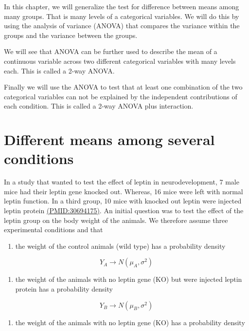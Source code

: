 \documentclass[
]{book}
\providecommand{\tightlist}{%
  \setlength{\itemsep}{0pt}\setlength{\parskip}{0pt}}
\begin{document}
In this chapter, we will generalize the test for difference between means among many groups. That is many levels of a categorical variables. We will do this by using the analysis of variance (ANOVA) that compares the variance within the groups and the variance between the groups.

We will see that ANOVA can be further used to describe the mean of a continuous variable across two different categorical variables with many levels each. This is called a 2-way ANOVA.

Finally we will use the ANOVA to test that at least one combination of the two categorical variables can not be explained by the independent contributions of each condition. This is called a 2-way ANOVA plus interaction.

\hypertarget{different-means-among-several-conditions}{%
\section{Different means among several conditions}\label{different-means-among-several-conditions}}

In a study that wanted to test the effect of leptin in neurodevelopment, 7 male mice had their leptin gene knocked out. Whereas, 16 mice were left with normal leptin function. In a third group, 10 mice with knocked out leptin were injected leptin protein \href{https://pubmed.ncbi.nlm.nih.gov/30694175/}{(PMID:30694175)}. An initial question was to test the effect of the leptin group on the body weight of the animals. We therefore assume three experimental conditions and that

\begin{enumerate}
\def\labelenumi{\arabic{enumi}.}
\tightlist
\item
  the weight of the control animals (wild type) has a probability density
\end{enumerate}

\[Y_A \rightarrow N(\mu_A, \sigma^2)\]

\begin{enumerate}
\def\labelenumi{\arabic{enumi}.}
\setcounter{enumi}{1}
\tightlist
\item
  the weight of the animals with no leptin gene (KO) but were injected leptin protein has a probability density
\end{enumerate}

\[Y_B \rightarrow N(\mu_B, \sigma^2)\]

\begin{enumerate}
\def\labelenumi{\arabic{enumi}.}
\setcounter{enumi}{2}
\tightlist
\item
  the weight of the animals with no leptin gene (KO) has a probability density
\end{enumerate}
\end{document}

